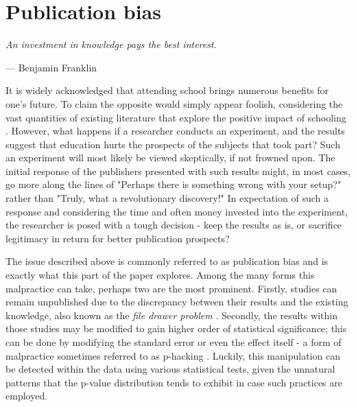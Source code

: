 \chapter{Publication bias}
\label{chap:four}

\begin{quoting}
\textit{An investment in knowledge pays the best interest.}
\end{quoting}
\vspace{-0.2em}
\hfill --- Benjamin Franklin
\vspace{0.5em}

It is widely acknowledged that attending school brings numerous benefits for one's future. To claim the opposite would simply appear foolish, considering the vast quantities of existing literature that explore the positive impact of schooling \citep{oreopoulos2013making, ritchie2018much, heckman2010rate, psacharopoulos2004returns}. However, what happens if a researcher conducts an experiment, and the results suggest that education hurts the prospects of the subjects that took part? Such an experiment will most likely be viewed skeptically, if not frowned upon. The initial response of the publishers presented with such results might, in most cases, go more along the lines of "Perhaps there is something wrong with your setup?" rather than "Truly, what a revolutionary discovery!" In expectation of such a response and considering the time and often money invested into the experiment, the researcher is posed with a tough decision - keep the results as is, or sacrifice legitimacy in return for better publication prospects?

The issue described above is commonly referred to as publication bias and is exactly what this part of the paper explores. Among the many forms this malpractice can take, perhaps two are the most prominent. Firstly, studies can remain unpublished due to the discrepancy between their results and the existing knowledge, also known as the \textit{file drawer problem} \citep{stanley2005beyond}. Secondly, the results within those studies may be modified to gain higher order of statistical significance; this can be done by modifying the standard error or even the effect itself - a form of malpractice sometimes referred to as p-hacking \citep{simmons2011false}. Luckily, this manipulation can be detected within the data using various statistical tests, given the unnatural patterns that the p-value distribution tends to exhibit in case such practices are employed.

